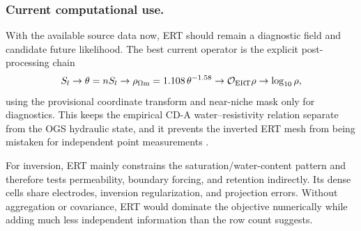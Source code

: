 \subsubsection*{Current computational use.}
With the available source data now, ERT should remain a diagnostic field and
candidate future likelihood.  The best current operator is the explicit
post-processing chain
\[
  S_l \rightarrow \theta=nS_l
  \rightarrow \rho_{\Omega\mathrm{m}}=1.108\,\theta^{-1.58}
  \rightarrow \mathcal O_{\mathrm{ERT}}\rho
  \rightarrow \log_{10}\rho ,
\]
using the provisional coordinate transform and near-niche mask only for
diagnostics.  This keeps the empirical CD-A water--resistivity relation separate
from the OGS hydraulic state, and it prevents the inverted ERT mesh from being
mistaken for independent point measurements
\citep[pp.~54--56]{Archie1942}
\citep[abstract and Secs.~2--4]{Revil1998ShalySands}
\citep[Secs.~4.1--4.3]{WaterContentEDZ2024}
\citep[ERT source files used for the generated field summaries]{CDAProvidedMeasurementFiles2025}.

For inversion, ERT mainly constrains the saturation/water-content pattern and
therefore tests permeability, boundary forcing, and retention indirectly.  Its
dense cells share electrodes, inversion regularization, and projection errors.
Without aggregation or covariance, ERT would dominate the objective numerically
while adding much less independent information than the row count suggests.

